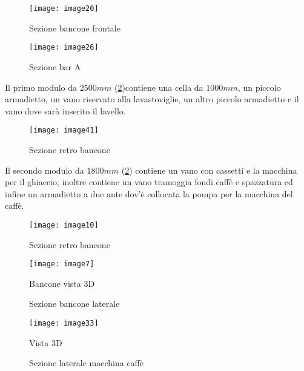 \begin{figure}[H]
	\centering
	\texttt{[image: image20]}
	\caption{Sezione bancone frontale}
	\label{fig:mesh1}
\end{figure}

\begin{figure}[H]
	\centering
	\texttt{[image: image26]}
	\caption{Sezione bar A}
\end{figure}

\noindent
Il primo modulo da $2500mm$ (\cref{fig:sezioneretrobancone})contiene una cella da $1000 mm$, un piccolo armadietto, un vano riservato alla lavastoviglie, un altro piccolo armadietto e il vano dove sarà inserito il lavello.

\begin{figure}[H]
	\centering
	\texttt{[image: image41]}
	\caption{Sezione retro bancone}
\end{figure}

\noindent
Il secondo modulo da $1800 mm$ (\cref{fig:sezioneretrobancone}) contiene un vano con cassetti e la macchina per il ghiaccio; inoltre contiene un vano tramoggia fondi caffè e spazzatura ed infine un armadietto a due ante dov'è collocata la pompa per la macchina del caffè.

\begin{figure}[H]
	\centering
	\texttt{[image: image10]}
	\caption{Sezione retro bancone}
	\label{fig:sezioneretrobancone}
\end{figure}
\begin{figure}[H]
	\centering
	\texttt{[image: image7]}
	\caption{Bancone vista 3D}
\end{figure}

\begin{figure}[H]
	\captionsetup[subfloat]{farskip=2pt,captionskip=8pt}
	\centering
	\hspace{1cm}
	
	\caption{Sezione bancone laterale}
	\label{fig:sezione bancone}
\end{figure}

\begin{figure}[H]
	\centering
	\texttt{[image: image33]}
	\caption{Vista 3D}
\end{figure}

\begin{figure}[H]
	\captionsetup[subfloat]{farskip=2pt,captionskip=8pt}
	\centering
	\hspace{1cm}
	
	\caption{Sezione laterale macchina caffè}
	\label{fig:sezionemacchinacaffe}
\end{figure}



